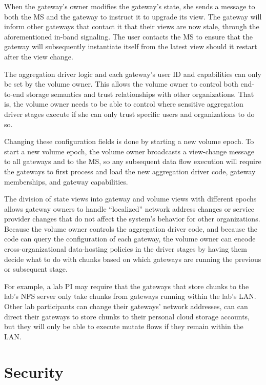 When the gateway's owner modifies the gateway's state, she sends a message to
both the MS and the gateway to instruct it to upgrade its view.
The gateway will inform other gateways that contact it that their views are now
stale, through the aforementioned in-band signaling.
The user contacts the MS to ensure that the gateway will subsequently
instantiate itself from the latest view should it restart after the view change.

The aggregation driver logic and each gateway's user ID and capabilities
can only be set by the volume owner.  This allows the volume owner to control
both end-to-end storage semantics and trust relationships with other organizations.
That is, the volume owner needs to be able to control where sensitive
aggregation driver stages execute if she can only trust specific users and
organizations to do so.

Changing these configuration fields is done by starting a new volume epoch.
To start a new volume epoch, the volume owner broadcasts a view-change message to
all gateways and to the MS, so any subsequent data flow execution will require
the gateways to first process and load the new aggregation driver code, gateway
memberships, and gateway capabilities.

The division of state views into gateway and volume views with different epochs
allows gateway owners to handle ``localized''
network address changes or service provider changes that do not affect the
system's behavior for other organizations.  Because the volume owner controls
the aggregation driver code, and because the code can query the 
configuration of each gateway, the volume owner can encode cross-organizational
data-hosting policies in the driver stages by having them decide what to do with
chunks based on which gateways are running the previous or subsequent stage.

For example, a lab PI may require that the gateways that store chunks
to the lab's NFS server only take chunks from gateways running within the lab's
LAN.  Other lab participants can change their gateways' network addresses, can
can direct their gateways to store chunks to their personal cloud storage
accounts, but they will only be able to execute mutate flows if they remain
within the LAN.

\section{Security}
\label{sec:security}

